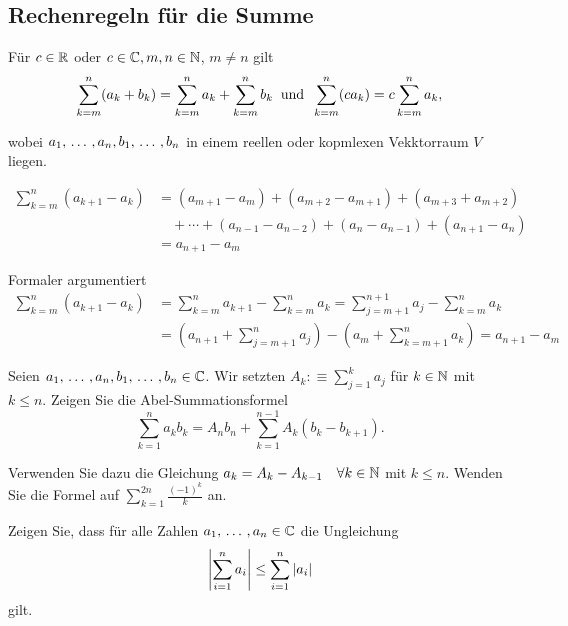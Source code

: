 \subsection{Rechenregeln für die Summe}
\begin{thm-non}
  Für $c \in \mathbb{R}$ oder $c \in \mathbb{C}, m,n \in \mathbb{N}$, $m\neq n$ gilt
\[
\sum_{k=m}^{n}(a_k + b_k) = \sum_{k=m}^{n}a_k + \sum_{k=m}^{n} b_k
\;\; \text{und}\;\;
\sum_{k=m}^{n}(c a_k) = c \sum_{k=m}^{n}a_k,
\]

wobei $a_1, {\, \ldots \,\,}, a_n, b_1, {\, \ldots \,\,}, b_n$ in einem reellen oder kopmlexen Vekktorraum $V$ liegen.
\end{thm-non}

\begin{thm-non}[Teleskopsumme]
  \[
  \begin{aligned}
    \sum_{k=m}^{n}(a_{k+1}-a_k) &= (a_{m+1}-a_m) + (a_{m+2}-a_{m+1}) + (a_{m+3} + a_{m+2}) \\
    & \quad + \cdots + (a_{n-1}-a_{n-2})+(a_n-a_{n-1}) + (a_{n+1}-a_n) \\
    & =a_{n+1} - a_m
  \end{aligned}
  \]
\end{thm-non}
\begin{prf}
  Formaler argumentiert
  \[
  \begin{aligned}
    \sum_{k=m}^{n}(a_{k+1} - a_k)
    &= \sum_{k=m}^{n} a_{k+1} - \sum_{k=m}^{n} a_k = \sum_{j=m+1}^{n+1} a_j - \sum_{k=m}^{n} a_k \\
    & = \left( a_{n+1} + \sum_{j=m+1}^{n} a_j \right) - \left(a_m + \sum_{k=m+1}^{n} a_k \right) = a_{n+1} - a_m
  \end{aligned}
  \]
\end{prf}

\begin{ex} Seien $a_1, {\, \ldots \,\,}, a_n, b_1, {\, \ldots \,\,}, b_n \in \mathbb{C}$. Wir setzten $A_k :\equiv \sum_{j=1}^{k}a_j$ für $k \in \mathbb{N}$ mit $k \leq n$.
Zeigen Sie die Abel-Summationsformel
\[
  \sum_{k=1}^{n}a_k b_k = A_n b_n + \sum_{k=1}^{n-1} A_k (b_k - b_{k+1}).
\]

Verwenden Sie dazu die Gleichung $a_k = A_k - A_{k-1}  \quad \forall k \in \mathbb{N}$ mit $k \leq n$. Wenden Sie die Formel auf $\sum_{k=1}^{2n} \frac{(-1)^k}{k}$ an.
\end{ex}

\begin{imp-ex}
  Zeigen Sie, dass für alle Zahlen $a_1, {\, \ldots \,\,}, a_n \in \mathbb{C}$ die Ungleichung
  \[
    \left|\sum_{i=1}^{n}a_i\right| \leq \sum_{i=1}^{n} \left|a_i\right|
  \]
  gilt.
\end{imp-ex}

